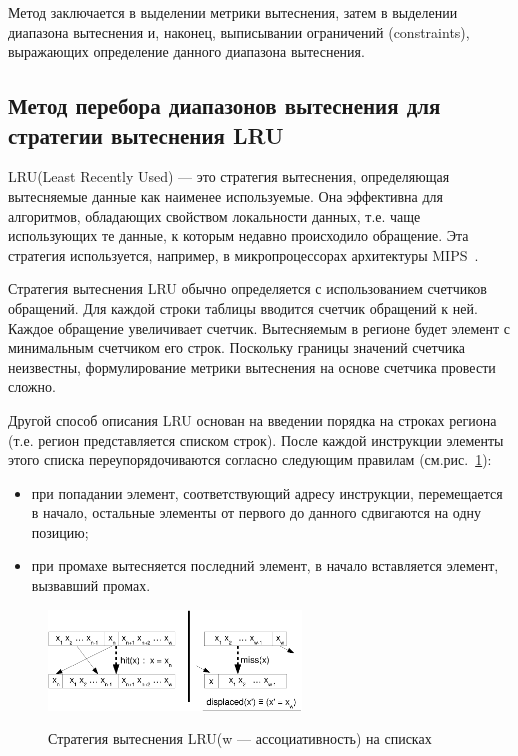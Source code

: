 \documentclass[14pt]{extreport}
\newcommand{\LRU}{\textsf{LRU}\xspace}
\begin{document}
Метод заключается в выделении метрики вытеснения, затем в выделении диапазона вытеснения и, наконец, выписывании ограничений (constraints), выражающих определение данного диапазона вытеснения.

\subsection{Метод перебора диапазонов вытеснения для стратегии
вытеснения \LRU}\label{sec:LRU_constraints}

\LRU (Least Recently Used) --- это стратегия вытеснения,
определяющая вытесняемые данные как наименее используемые. Она
эффективна для алгоритмов, обладающих свойством локальности данных,
т.е. чаще использующих те данные, к которым недавно происходило
обращение. Эта стратегия используется, например, в микропроцессорах
архитектуры MIPS~\cite{mips64_II}.

Стратегия вытеснения \LRU обычно определяется с использованием
счетчиков обращений. Для каждой строки таблицы
вводится счетчик обращений к ней. Каждое обращение увеличивает
счетчик. Вытесняемым в регионе будет элемент с минимальным счетчиком его строк.
Поскольку границы значений счетчика неизвестны, формулирование
метрики вытеснения на основе счетчика провести сложно.

Другой способ описания \LRU основан на введении порядка на строках региона (т.е. регион представляется списком строк). После каждой
инструкции элементы этого списка переупорядочиваются согласно следующим правилам
(см.рис.~\ref{fig:lru1}):
\begin{itemize}
\item при попадании элемент, соответствующий адресу инструкции,
перемещается в начало, остальные элементы от первого до данного
сдвигаются на одну позицию;
\item при промахе вытесняется последний элемент, в начало
вставляется элемент, вызвавший промах.
\end{itemize}

\begin{figure}[h] \center
  \includegraphics[width=0.6\textwidth]{2.theor/lru1}\\
  \caption{Стратегия вытеснения \LRU (w --- ассоциативность) на списках}\label{fig:lru1}
\end{figure}
\end{document}
